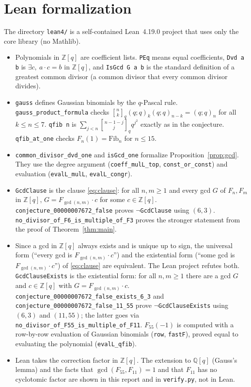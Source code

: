 \documentclass[11pt]{article}
\theoremstyle{remark}
\newcommand{\qbinom}[2]{\genfrac{[}{]}{0pt}{}{#1}{#2}_q}
\begin{document}
\section{Lean formalization}

The directory \texttt{lean4/} is a self-contained Lean~4.19.0 project that uses
only the core library (no Mathlib).
\begin{itemize}
\item Polynomials in $\mathbb Z[q]$ are coefficient lists. \texttt{PEq} means
equal coefficients, \texttt{Dvd a b} is $\exists c,\ a\cdot c=b$ in $\mathbb Z[q]$,
and \texttt{IsGcd G a b} is the standard definition of a greatest common
divisor (a common divisor that every common divisor divides).
\item \texttt{gauss} defines Gaussian binomials by the $q$-Pascal rule.
\texttt{gauss\_product\_formula} checks
$\qbinom{n}{k}(q;q)_k(q;q)_{n-k}=(q;q)_n$ for all $k\le n\le7$.
\texttt{qfib n} is $\sum_{j<n}\qbinom{n-1-j}{j}q^{j^2}$ exactly as in the
conjecture. \texttt{qfib\_at\_one} checks $F_n(1)=\mathrm{Fib}_n$ for $n\le15$.
\item \texttt{common\_divisor\_dvd\_one} and \texttt{isGcd\_one} formalize
Proposition~\ref{prop:gcd}. They use the degree argument
(\texttt{coeff\_mulL\_top}, \texttt{const\_or\_const}) and evaluation
(\texttt{evalL\_mulL}, \texttt{evalL\_congr}).
\item \texttt{GcdClause} is the clause \eqref{eq:clause}: for all $n,m\ge1$ and
every gcd $G$ of $F_n,F_m$ in $\mathbb Z[q]$, $G=F_{\gcd(n,m)}\cdot c$ for some
$c\in\mathbb Z[q]$. \texttt{conjecture\_00000007672\_false} proves
$\neg$\texttt{GcdClause} using $(6,3)$.
\texttt{no\_divisor\_of\_F6\_is\_multiple\_of\_F3} proves the stronger statement
from the proof of Theorem~\ref{thm:main}.
\item Since a gcd in $\mathbb Z[q]$ always exists and is unique up to sign, the
universal form (``every gcd is $F_{\gcd(n,m)}\cdot c$'') and the existential
form (``some gcd is $F_{\gcd(n,m)}\cdot c$'') of \eqref{eq:clause} are
equivalent. The Lean project refutes both.
\texttt{GcdClauseExists} is the existential form: for all $n,m\ge1$ there
are a gcd $G$ and $c\in\mathbb Z[q]$ with $G=F_{\gcd(n,m)}\cdot c$.
\texttt{conjecture\_00000007672\_false\_exists\_6\_3} and
\texttt{conjecture\_00000007672\_false\_11\_55} prove
$\neg$\texttt{GcdClauseExists} using $(6,3)$ and $(11,55)$; the latter goes via
\texttt{no\_divisor\_of\_F55\_is\_multiple\_of\_F11}. $F_{55}(-1)$ is computed
with a row-by-row evaluation of Gaussian binomials (\texttt{row},
\texttt{fastF}), proved equal to evaluating the polynomial
(\texttt{evalL\_qfib}).
\item Lean takes the correction factor in $\mathbb Z[q]$. The extension to
$\mathbb Q[q]$ (Gauss's lemma) and the facts that $\gcd(F_{55},F_{11})=1$ and that
$F_{11}$ has no cyclotomic factor are shown in this report and in
\texttt{verify.py}, not in Lean.
\end{itemize}
\end{document}
